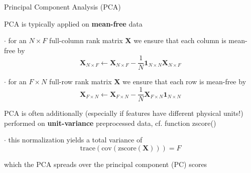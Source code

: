 \documentclass[mathserif, aspectratio=1610]{intbeamer}
\begin{document}
\begin{frame}[t]{Principal Component Analysis (PCA)}

PCA is typically applied on \textbf{mean-free} data

$\cdot$ for an $N \times F$ full-column rank matrix $\bm{X}$ we ensure that each column is mean-free by
$$\bm{X}_{N \times F} \leftarrow \bm{X}_{N \times F} - \frac{1}{N} \bm{1}_{N \times N} \bm{X}_{N \times F}$$

$\cdot$ for an $F \times N$ full-row rank matrix $\bm{X}$ we ensure that each row is mean-free by
$$\bm{X}_{F \times N} \leftarrow \bm{X}_{F \times N} - \frac{1}{N} \bm{X}_{F \times N} \bm{1}_{N \times N}$$

PCA is often additionally (especially if features have different physical units!) performed on \textbf{unit-variance} preprocessed data, cf. function zscore()

$\cdot$ this normalization yields a total variance of $$\mathrm{trace}(\mathrm{cov}(\mathrm{zscore}(\bm{X})))= F$$

which the PCA spreads over the principal component (PC) scores

\end{frame}
\end{document}
